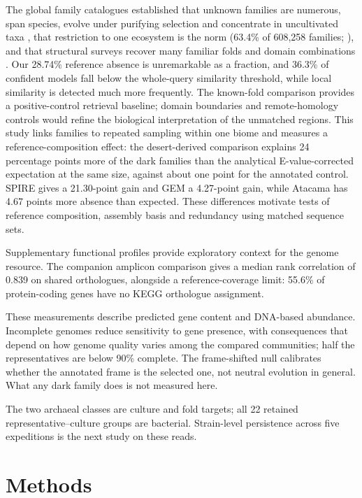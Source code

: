 \documentclass[11pt]{article}
\begin{document}
The global family catalogues established that unknown families are numerous, span species, evolve
under purifying selection and concentrate in uncultivated taxa
\citep{rodriguezdelrio2024fesnov,pavlopoulos2023darkmatter,vanni2022agnostos}, that restriction to
one ecosystem is the norm (63.4\% of 608{,}258 families; \citep{aplakidou2025quadrupling}), and
that structural surveys recover many familiar folds and domain combinations
\citep{lau2024ted,yeo2025afesm}. Our 28.74\% reference absence is unremarkable as a fraction, and
36.3\% of confident models fall below the whole-query similarity threshold, while local
similarity is detected much more frequently. The known-fold comparison provides a positive-control
retrieval baseline; domain boundaries and remote-homology controls would refine the biological
interpretation of the unmatched regions. This study links families to repeated sampling within one biome and measures a reference-composition effect: the desert-derived comparison explains 24 percentage points more of the dark families
than the analytical E-value-corrected expectation at the same size, against about one point for the annotated control. SPIRE gives a 21.30-point gain and GEM a 4.27-point gain, while Atacama has 4.67 points more absence than expected. These differences motivate tests of reference composition, assembly basis and redundancy using matched sequence sets.

Supplementary functional profiles provide exploratory context for the genome resource.
The companion amplicon comparison gives a median rank correlation of 0.839 on shared
orthologues, alongside a reference-coverage limit: 55.6\% of protein-coding genes have no
KEGG orthologue assignment.

These measurements describe predicted gene content and DNA-based abundance. Incomplete genomes
reduce sensitivity to gene presence, with consequences that depend on how genome quality varies
among the compared communities; half the representatives
are below 90\% complete. The frame-shifted null
calibrates whether the annotated frame is the selected one, not neutral evolution in general. What
any dark family does is not measured here.

The two archaeal classes are culture and fold targets; all 22 retained representative--culture groups are bacterial. Strain-level persistence across five expeditions is the next study on
these reads.

\section*{Methods}
\end{document}
